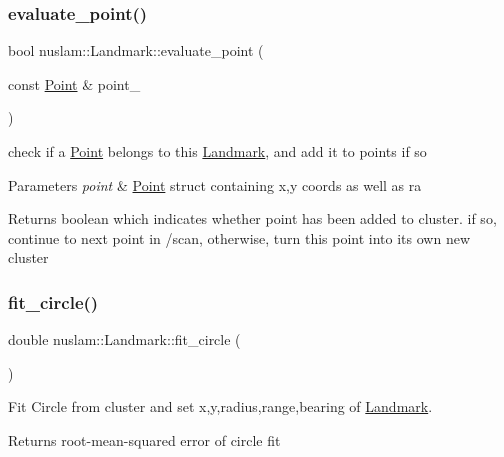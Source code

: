 \subsubsection{\texorpdfstring{evaluate\+\_\+point()}{evaluate\_point()}}
{\footnotesize\ttfamily bool nuslam\+::\+Landmark\+::evaluate\+\_\+point (\begin{DoxyParamCaption}\item[{const \hyperlink{structnuslam_1_1Point}{Point} \&}]{point\+\_\+ }\end{DoxyParamCaption})}



check if a \hyperlink{structnuslam_1_1Point}{Point} belongs to this \hyperlink{classnuslam_1_1Landmark}{Landmark}, and add it to points if so 


\begin{DoxyParams}{Parameters}
{\em point} & \hyperlink{structnuslam_1_1Point}{Point} struct containing x,y coords as well as ra \\
\hline
\end{DoxyParams}
\begin{DoxyReturn}{Returns}
boolean which indicates whether point has been added to cluster. if so, continue to next point in /scan, otherwise, turn this point into its own new cluster 
\end{DoxyReturn}
\mbox{\label{classnuslam_1_1Landmark_a9279c2d247c718c39de112b5d655f2f9}} 
\subsubsection{\texorpdfstring{fit\+\_\+circle()}{fit\_circle()}}
{\footnotesize\ttfamily double nuslam\+::\+Landmark\+::fit\+\_\+circle (\begin{DoxyParamCaption}{ }\end{DoxyParamCaption})}



Fit Circle from cluster and set x,y,radius,range,bearing of \hyperlink{classnuslam_1_1Landmark}{Landmark}. 

\begin{DoxyReturn}{Returns}
root-\/mean-\/squared error of circle fit 
\end{DoxyReturn}
\mbox{\label{classnuslam_1_1Landmark_a15b17b9758ceb73359a0d880c9e186d9}} 
